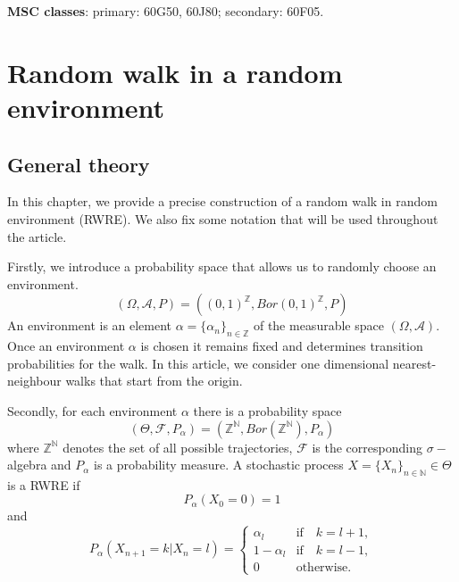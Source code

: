 \documentclass[12pt]{article}
\begin{document}
\textbf{MSC classes}:	primary: 60G50, 60J80; secondary: 60F05.

\section{Random walk in a random environment}
\subsection{General theory}
In this chapter, we provide a precise construction of a random walk in random environment (RWRE). We also fix some notation that will be used throughout the article. 

\bigskip
Firstly, we introduce a probability space that allows us to randomly choose an environment. 
\begin{equation*}
    ( \Omega, \mathcal{A}, P) = ( (0,1)^\mathbb{Z}, Bor(0,1)^\mathbb{Z}, P)
\end{equation*}
An environment is an element $ \alpha = \{ \alpha_n\}_{n \in \mathbb{Z}} $ of the measurable space  $( \Omega, \mathcal{A}).$ Once an environment $\alpha$ is chosen it remains fixed and determines transition probabilities for the walk. In this article, we consider one dimensional nearest-neighbour walks that start from the origin. 

\bigskip
Secondly, for each environment $\alpha$ there is a probability space 
\begin{equation*}
     (\Theta, \mathcal{F}, P_\alpha) = (\mathbb{Z}^\mathbb{N}, Bor(\mathbb{Z}^\mathbb{N}), P_\alpha)
\end{equation*}
where $\mathbb{Z}^\mathbb{N}$ denotes the set of all possible trajectories, $\mathcal{F}$ is the corresponding $\sigma-$algebra and $P_\alpha$ is a probability measure. A stochastic process $X = \{ X_n \}_{n \in \mathbb{N}} \in \Theta$ is a RWRE if 
\begin{equation*}
    P_\alpha ( X_0 = 0) = 1
\end{equation*}
and 
\begin{equation*}
    P_\alpha( X_{n+1} = k | X_n = l) = 
    \begin{cases} 
        \alpha_l  & \text{if} \quad k = l + 1, \\ 
        1 - \alpha_l  & \text{if} \quad  k = l - 1, \\ 
        0 & \text{otherwise.}
    \end{cases}
\end{equation*}
\end{document}
